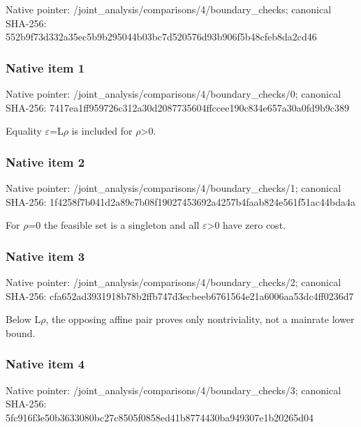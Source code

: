 \documentclass[10pt,a4paper]{article}
\begin{document}
Native pointer: /joint\_analysis/comparis\allowbreak{}ons/4/boundary\_checks; canonical SHA-256: 552b9f73d332a35ec5b9b295\allowbreak{}044b03bc7d520576d93b906f\allowbreak{}5b48cfeb8da2cd46



\subsubsection{Native item 1}


Native pointer: /joint\_analysis/comparis\allowbreak{}ons/4/boundary\_checks/0; canonical SHA-256: 7417ea1ff959726c312a30d2\allowbreak{}087735604ffccee190c834e6\allowbreak{}57a30a0fd9b9c389


Equality \ensuremath{\varepsilon}=L\ensuremath{\rho} is included for \ensuremath{\rho}>0.


\subsubsection{Native item 2}


Native pointer: /joint\_analysis/comparis\allowbreak{}ons/4/boundary\_checks/1; canonical SHA-256: 1f4258f7b041d2a89c7b08f1\allowbreak{}9027453692a4257b4faab824\allowbreak{}e561f51ac44bda4a


For \ensuremath{\rho}=0 the feasible set is a singleton and all \ensuremath{\varepsilon}>0 have zero cost.


\subsubsection{Native item 3}


Native pointer: /joint\_analysis/comparis\allowbreak{}ons/4/boundary\_checks/2; canonical SHA-256: cfa652ad3931918b78b2ffb7\allowbreak{}47d3ecbeeb6761564e21a600\allowbreak{}6aa53dc4ff0236d7


Below L\ensuremath{\rho}, the opposing affine pair proves only nontriviality, not a mainrate lower bound.


\subsubsection{Native item 4}


Native pointer: /joint\_analysis/comparis\allowbreak{}ons/4/boundary\_checks/3; canonical SHA-256: 5fc916f3e50b3633080bc27c\allowbreak{}8505f0858ed41b8774430ba9\allowbreak{}49307e1b20265d04
\end{document}
